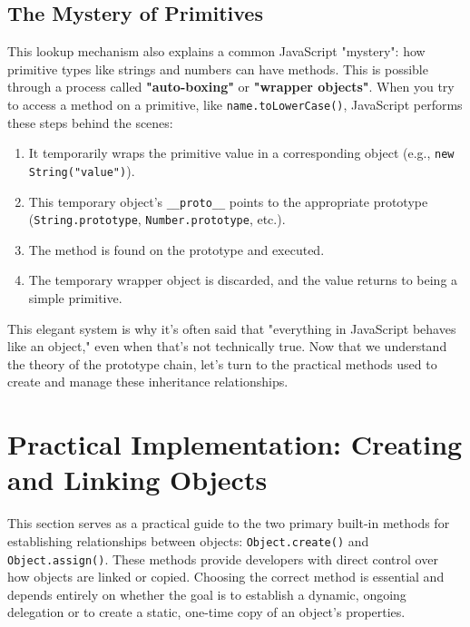 \documentclass{scrbook}
\begin{document}
\section{The Mystery of Primitives}

This lookup mechanism also explains a common JavaScript "mystery": how primitive types like strings and numbers can have methods. This is possible through a process called \textbf{"auto-boxing"} or \textbf{"wrapper objects"}. When you try to access a method on a primitive, like \texttt{name.toLowerCase()}, JavaScript performs these steps behind the scenes:

\begin{enumerate}
    \item
    It temporarily wraps the primitive value in a corresponding object (e.g., \texttt{new String("value")}).
    
    \item
    This temporary object's \texttt{\_\_proto\_\_} points to the appropriate prototype (\texttt{String.prototype}, \texttt{Number.prototype}, etc.).
    
    \item
    The method is found on the prototype and executed.
    
    \item
    The temporary wrapper object is discarded, and the value returns to being a simple primitive.
\end{enumerate}

This elegant system is why it's often said that "everything in JavaScript behaves like an object," even when that's not technically true. Now that we understand the theory of the prototype chain, let's turn to the practical methods used to create and manage these inheritance relationships.

\chapter{Practical Implementation: Creating and Linking Objects}

This section serves as a practical guide to the two primary built-in methods for establishing relationships between objects: \texttt{Object.create()} and \texttt{Object.assign()}. These methods provide developers with direct control over how objects are linked or copied. Choosing the correct method is essential and depends entirely on whether the goal is to establish a dynamic, ongoing delegation or to create a static, one-time copy of an object's properties.
\end{document}
